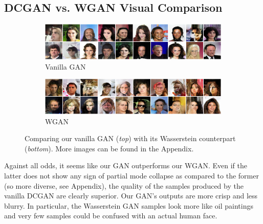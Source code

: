 \documentclass[table]{article}
\begin{document}
\subsection{DCGAN vs. WGAN Visual Comparison}
\begin{figure}[ht]
  \centering
  \begin{subfigure}{\textwidth}
    \centering
    \includegraphics[scale=0.5]{imgs/gan_examples}
    \caption{Vanilla GAN}
  \end{subfigure}

  \vspace*{3mm}
  \begin{subfigure}{\textwidth}
    \centering
    \includegraphics[scale=0.5]{imgs/wgan_examples}
    \caption{WGAN}
  \end{subfigure}
  \caption{Comparing our vanilla GAN (\textit{top}) with its Wasserstein counterpart (\textit{bottom}). More images can be found in the Appendix.}
    \label{compare}
\end{figure}

Against all odds, it seems like our GAN outperforms our WGAN. Even if the latter does not show any sign of partial mode collapse as compared to the former (so more diverse, see Appendix), the quality of the samples produced by the vanilla DCGAN are clearly superior. Our GAN's outputs are more crisp and less blurry. In particular, the Wasserstein GAN samples look more like oil paintings and very few samples could be confused with an actual human face.
\end{document}
